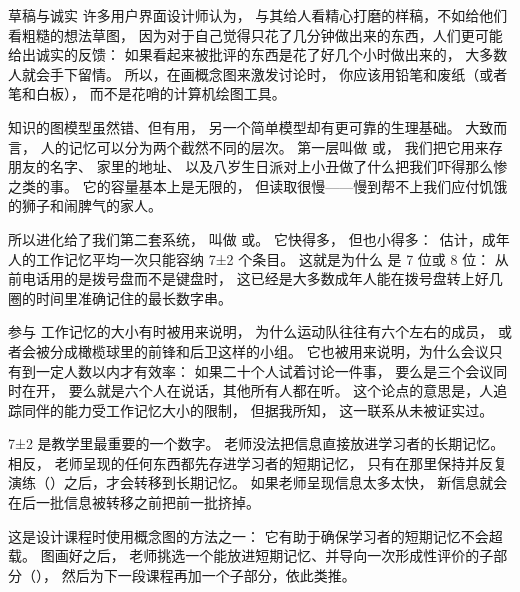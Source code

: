 \begin{aside}{草稿与诚实}
  许多用户界面设计师认为，
  与其给人看精心打磨的样稿，不如给他们看粗糙的想法草图，
  因为对于自己觉得只花了几分钟做出来的东西，人们更可能给出诚实的反馈：
  如果看起来被批评的东西是花了好几个小时做出来的，
  大多数人就会手下留情。
  所以，在画概念图来激发讨论时，
  你应该用铅笔和废纸（或者笔和白板），
  而不是花哨的计算机绘图工具。
\end{aside}


知识的图模型虽然错、但有用，
另一个简单模型却有更可靠的生理基础。
大致而言，
人的记忆可以分为两个截然不同的层次。
第一层叫做
或，
我们把它用来存朋友的名字、
家里的地址、
以及八岁生日派对上小丑做了什么把我们吓得那么惨之类的事。
它的容量基本上是无限的，
但读取很慢——慢到帮不上我们应付饥饿的狮子和闹脾气的家人。

所以进化给了我们第二套系统，
叫做
或。
它快得多，
但也小得多：~\cite{Mill1956}估计，成年人的工作记忆平均一次只能容纳 7±2 个条目。
这就是为什么
是 7 位或 8 位：
从前电话用的是拨号盘而不是键盘时，
这已经是大多数成年人能在拨号盘转上好几圈的时间里准确记住的最长数字串。

\begin{aside}{参与}
  工作记忆的大小有时被用来说明，
  为什么运动队往往有六个左右的成员，
  或者会被分成橄榄球里的前锋和后卫这样的小组。
  它也被用来说明，为什么会议只有到一定人数以内才有效率：
  如果二十个人试着讨论一件事，
  要么是三个会议同时在开，
  要么就是六个人在说话，其他所有人都在听。
  这个论点的意思是，人追踪同伴的能力受工作记忆大小的限制，
  但据我所知，
  这一联系从未被证实过。
\end{aside}

7±2 是教学里最重要的一个数字。
老师没法把信息直接放进学习者的长期记忆。
相反，
老师呈现的任何东西都先存进学习者的短期记忆，
只有在那里保持并反复演练（）之后，才会转移到长期记忆。
如果老师呈现信息太多太快，
新信息就会在后一批信息被转移之前把前一批挤掉。

这是设计课程时使用概念图的方法之一：
它有助于确保学习者的短期记忆不会超载。
图画好之后，
老师挑选一个能放进短期记忆、并导向一次形成性评价的子部分（），
然后为下一段课程再加一个子部分，依此类推。

